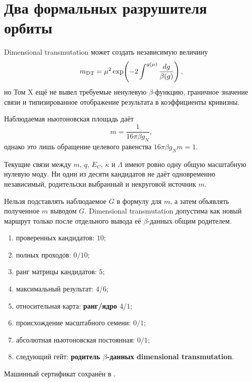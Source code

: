 \section{Два формальных разрушителя орбиты}

Dimensional transmutation может создать независимую величину
\begin{equation}
 m_{\rm DT}=\mu^2
 \exp\!\left(-2\int^{g(\mu)}\frac{dg}{\beta(g)}\right),
 \label{eq:v10-newton-seed-dimensional-transmutation}
\end{equation}
но Том X ещё не вывел требуемые ненулевую $\beta$-функцию, граничное
значение связи и типизированное отображение результата в коэффициенты
кривизны.

Наблюдаемая ньютоновская площадь даёт
\begin{equation}
 m=\frac{1}{16\pi\beta g_N},
 \label{eq:v10-newton-seed-observed-G}
\end{equation}
однако это лишь обращение целевого равенства $16\pi\beta g_Nm=1$.

\begin{theorem}
Текущие связи между $m$, $q$, $E_C$, $\kappa$ и $\Lambda$ имеют ровно одну
общую масштабную нулевую моду. Ни один из десяти кандидатов не даёт
одновременно независимый, родительски выбранный и некруговой источник $m$.
\end{theorem}

\begin{nogocriterion}
Нельзя подставлять наблюдаемое $G$ в формулу для $m$, а затем объявлять
полученное $m$ выводом $G$. Dimensional transmutation допустима как новый
маршрут только после отдельного вывода её $\beta$-данных общим родителем.
\end{nogocriterion}

\begin{protocol}\begin{enumerate}\raggedright
\item проверенных кандидатов: \textbf{$10$};
\item полных проходов: \textbf{$0/10$};
\item ранг матрицы кандидатов: \textbf{$5$};
\item максимальный результат: \textbf{$4/6$};
\item относительная карта: \textbf{ранг/ядро $4/1$};
\item происхождение масштабного семени: \textbf{$0/1$};
\item абсолютная ньютоновская постоянная: \textbf{$0/1$};
\item следующий гейт: \textbf{родитель $\beta$-данных dimensional transmutation}.
\end{enumerate}\end{protocol}

Машинный сертификат сохранён в
.